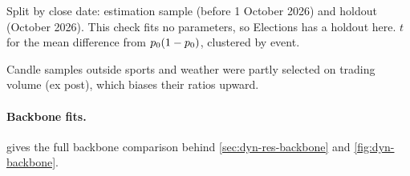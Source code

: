 \begin{table}[ht]
\begin{threeparttable}
\begin{tablenotes}[flushleft]
\item Split by close date: estimation sample (before 1 October 2026) and holdout (October 2026). This check fits no parameters, so Elections has a holdout here. $t$ for the mean difference from $p_0(1-p_0)$, clustered by event.
\item Candle samples outside sports and weather were partly selected on trading volume (ex post), which biases their ratios upward.
\end{tablenotes}
\end{threeparttable}
\end{table}

\paragraph{Backbone fits.}
 gives the full backbone comparison behind \cref{sec:dyn-res-backbone} and
\cref{fig:dyn-backbone}.

